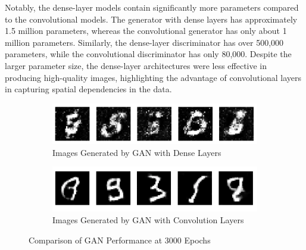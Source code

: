 Notably, the dense-layer models contain significantly more parameters compared to the convolutional models. The generator with dense layers has approximately 1.5 million parameters, whereas the convolutional generator has only about 1 million parameters. Similarly, the dense-layer discriminator has over 500,000 parameters, while the convolutional discriminator has only 80,000. Despite the larger parameter size, the dense-layer architectures were less effective in producing high-quality images, highlighting the advantage of convolutional layers in capturing spatial dependencies in the data.

\begin{figure}[H]
    \centering
    \begin{subfigure}[b]{\linewidth}
        \centering
        \includegraphics[width=0.7\linewidth]{./Images/generate_image_by_dense_layer.jpg}
        \caption{Images Generated by GAN with Dense Layers}
        \label{fig:generated_dense}
    \end{subfigure}
    \vspace{0.05\linewidth} 
    \begin{subfigure}[b]{\linewidth}
        \centering
        \includegraphics[width=0.7\linewidth]{./Images/generate_image_by_Convolution_layer.jpg}
        \caption{Images Generated by GAN with Convolution Layers}
        \label{fig:generated_conv}
    \end{subfigure}
    \caption{Comparison of GAN Performance at 3000 Epochs}
    \label{fig:generated_images}
\end{figure}

